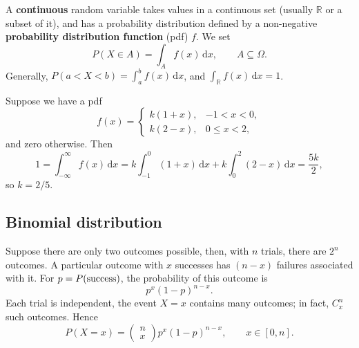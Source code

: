 \documentclass[letter-paper]{tufte-book}
\newenvironment{example}[1][Example]{\begin{trivlist}
\item[\hskip \labelsep {\bfseries #1}]}{\end{trivlist}}
\newcommand\Def[1]{\textbf{#1}}
\begin{document}
A \Def{continuous} random variable takes values in a continuous set (usually
$\mathbb{R}$ or a subset of it), and has a probability distribution defined by a
non-negative \Def{probability distribution function} (pdf) $f$. We set
\begin{equation*}
  P(X\in A) = \int_A f(x)\, \mathrm{d}x,\qquad A\subseteq\Omega.
\end{equation*}
Generally, $P(a<X<b) = \int_a^b f(x)\, \mathrm{d}x$, and
$\int_{\mathbb{R}}f(x)\, \mathrm{d}x=1$.
\begin{example}
  Suppose we have a pdf
  \begin{equation*}
    f(x) = \begin{cases} k(1+x), & -1<x<0,\\ k(2-x), & 0\leq x<2,\end{cases}
  \end{equation*}
  and zero otherwise. Then
  \begin{equation*}
    1=\int_{-\infty}^\infty f(x)\, \mathrm{d}x = 
    k\int_{-1}^0(1+x)\, \mathrm{d}x + k\int_0^2 (2-x)\, \mathrm{d}x=
    \frac{5k}{2},
  \end{equation*}
  so $k=2/5$.
\end{example}


\subsection{Binomial distribution}

Suppose there are only two outcomes possible, then, with $n$ trials, there are
$2^n$ outcomes. A particular outcome with $x$ successes has $(n-x)$ failures
associated with it. For $p=P(\textnormal{success})$, the probability of this
outcome is
\begin{equation*}
  p^x (1-p)^{n-x}.
\end{equation*}
Each trial is independent, the event $X=x$ contains many outcomes; in fact,
$C^n_x$ such outcomes. Hence
\begin{equation*}
  P(X=x) = \begin{pmatrix}n\\ x \end{pmatrix} p^x (1-p)^{n-x},\qquad
  x\in[0,n].
\end{equation*}
\end{document}
